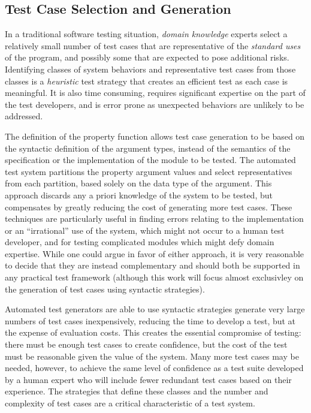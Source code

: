 \subsection{Test Case Selection and Generation}
In a traditional software testing situation, 
\emph{domain knowledge} experts select 
a relatively small number of test cases that are representative of
the \emph{standard uses} of the program,
and possibly some that are expected to pose additional risks.
Identifying classes of system behaviors and representative test cases from those classes
is a \emph{heuristic} test strategy that creates an efficient test as each case is meaningful.
It is also time consuming, requires significant expertise on the part of the test developers,
and is error prone as unexpected behaviors are unlikely to be addressed.

The definition of the property function
allows test case generation to be based on
the syntactic definition of the argument types,
instead of the semantics of the specification
or the implementation of the module to be tested.
The automated test system partitions the property argument values
and select representatives from each partition,
based solely on the data type of the argument.
This approach discards any a priori knowledge of the system to be tested,
but compensates by greatly reducing the cost of generating more test cases.
These techniques are particularly useful in finding
errors relating to the implementation or an ``irrational'' use of the system,
which might not occur to a human test developer,
and for testing complicated modules which might defy domain expertise.
While one could argue in favor of either approach,
it is very reasonable to decide that they are instead complementary
and should both be supported in any practical test framework
(although this work will focus almost exclusivley on the generation of test cases using syntactic strategies).

Automated test generators are able to use syntactic strategies
generate very large numbers of test cases inexpensively,
reducing the time to develop a test,
but at the expense of evaluation costs.
This creates the essential compromise of testing:
there must be enough test cases to create confidence,
but the cost of the test must be reasonable given the value of the system.
Many more test cases may be needed, however,
to achieve the same level of confidence as
a test suite developed by a human expert
who will include fewer redundant test cases based on their experience.
The strategies that define these classes and
the number and complexity of test cases
are a critical characteristic of a test system.

